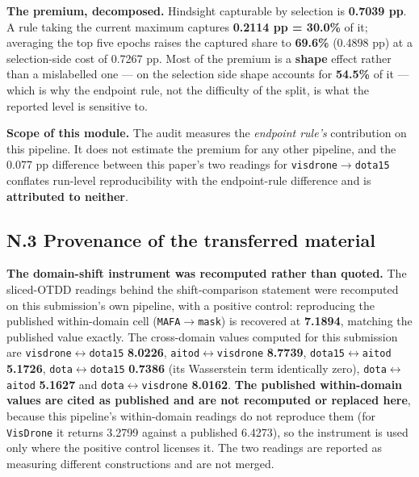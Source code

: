 \documentclass[pdflatex,sn-mathphys-ay]{sn-jnl}
\begin{document}
\textbf{The premium, decomposed.} Hindsight capturable by selection is \textbf{0.7039 pp}. A rule taking the current maximum captures \textbf{0.2114 pp = 30.0\%} of it; averaging the top five epochs raises the captured share to \textbf{69.6\%} (0.4898 pp) at a selection-side cost of 0.7267 pp. Most of the premium is a \textbf{shape} effect rather than a mislabelled one --- on the selection side shape accounts for \textbf{54.5\%} of it --- which is why the endpoint rule, not the difficulty of the split, is what the reported level is sensitive to.

\textbf{Scope of this module.} The audit measures the \emph{endpoint rule's} contribution on this pipeline. It does not estimate the premium for any other pipeline, and the 0.077 pp difference between this paper's two readings for \texttt{visdrone\ensuremath{\rightarrow}dota15} conflates run-level reproducibility with the endpoint-rule difference and is \textbf{attributed to neither}.

\subsection*{N.3 Provenance of the transferred material}

\textbf{The domain-shift instrument was recomputed rather than quoted.} The sliced-OTDD readings behind the shift-comparison statement were recomputed on this submission's own pipeline, with a positive control: reproducing the published within-domain cell (\texttt{MAFA\ensuremath{\rightarrow}mask}) is recovered at \textbf{7.1894}, matching the published value exactly. The cross-domain values computed for this submission are \texttt{visdrone\ensuremath{\leftrightarrow}dota15} \textbf{8.0226}, \texttt{aitod\ensuremath{\leftrightarrow}visdrone} \textbf{8.7739}, \texttt{dota15\ensuremath{\leftrightarrow}aitod} \textbf{5.1726}, \texttt{dota\ensuremath{\leftrightarrow}dota15} \textbf{0.7386} (its Wasserstein term identically zero), \texttt{dota\ensuremath{\leftrightarrow}aitod} \textbf{5.1627} and \texttt{dota\ensuremath{\leftrightarrow}visdrone} \textbf{8.0162}. \textbf{The published within-domain values are cited as published and are not recomputed or replaced here}, because this pipeline's within-domain readings do not reproduce them (for \texttt{VisDrone} it returns 3.2799 against a published 6.4273), so the instrument is used only where the positive control licenses it. The two readings are reported as measuring different constructions and are not merged.
\end{document}
